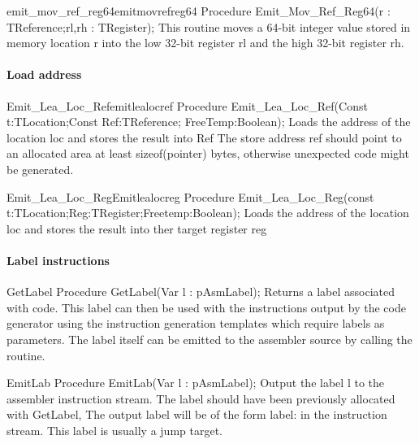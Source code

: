\documentclass [a4paper,12pt]{article}
\begin{document}
\begin{functionl}{emit{\_}mov{\_}ref{\_}reg64}{emitmovrefreg64}
\Declaration
Procedure Emit{\_}Mov{\_}Ref{\_}Reg64(r : TReference;rl,rh : TRegister);
\Description
This routine moves a 64-bit integer value stored in memory location
\textsf{r} into the low 32-bit register \textsf{rl} and the high 32-bit
register \textsf{rh}.
\end{functionl}

\paragraph{Load address}

\begin{functionl}{Emit{\_}Lea{\_}Loc{\_}Ref}{emitlealocref}
\Declaration
Procedure Emit{\_}Lea{\_}Loc{\_}Ref(Const t:TLocation;Const Ref:TReference; FreeTemp:Boolean);
\Description
Loads the address of the location \textsf{loc }and stores the result into
\textsf{Ref}
\Notes
The store address \textsf{ref }should point to an allocated area at least
\textsf{sizeof(pointer)} bytes, otherwise unexpected code might be
generated.
\end{functionl}

\begin{functionl}{Emit{\_}Lea{\_}Loc{\_}Reg}{Emitlealocreg}
\Declaration
Procedure Emit{\_}Lea{\_}Loc{\_}Reg(const t:TLocation;Reg:TRegister;Freetemp:Boolean);
\Description
Loads the address of the location \textsf{loc }and stores the result into
ther target register \textsf{reg}
\end{functionl}

\paragraph{Label instructions}

\begin{procedure}{GetLabel}
\Declaration
Procedure GetLabel(Var l : pAsmLabel);
\Description
Returns a label associated with code. This label can then be used with the
instructions output by the code generator using the instruction generation
templates which require labels as parameters. The label itself can be
emitted to the assembler source by calling the  routine.
\end{procedure}

\begin{procedure}{EmitLab}
\Declaration
Procedure EmitLab(Var l : pAsmLabel);
\Description
Output the label \textsf{l} to the assembler instruction stream.
\Notes
The label should have been previously allocated with \textsf{GetLabel}, The
output label will be of the form label: in the instruction stream. This
label is usually a jump target.
\end{procedure}
\end{document}
